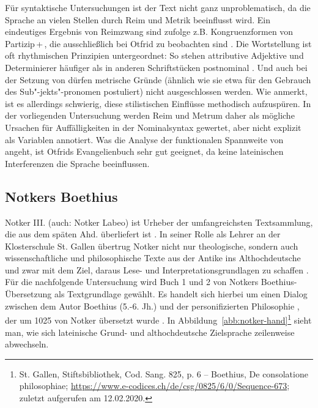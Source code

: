 Für syntaktische Untersuchungen ist der Text nicht ganz unproblematisch, da die Sprache an vielen Stellen durch Reim und Metrik beeinflusst wird. Ein eindeutiges Ergebnis von  Reimzwang sind \textcite[35-36]{Fleischer2006} zufolge z.B. Kongruenzformen von Partizip\,+\,, die ausschließlich bei Otfrid zu beobachten sind \parencites()()[s. auch][52]{Fleischer2011}[]{Gillmann2016}. 
Die Wortstellung ist oft rhythmischen Prinzipien untergeordnet: So stehen attributive Adjektive und Determinierer häufiger als in anderen Schriftstücken postnominal \parencites()()[282-283]{Oubouzar1989}[29]{Schrodt2004}. Und auch bei der Setzung von  dürfen metrische Gründe (ähnlich wie  \textcite{Eggenberger1961} sie etwa für den Gebrauch des Sub"-jekts"-pronomen postuliert) nicht ausgeschlossen werden. Wie \textcite[37]{Fleischer2006} anmerkt, ist es allerdings schwierig, diese stilistischen Einflüsse methodisch aufzuspüren. In der vorliegenden Untersuchung werden Reim und Metrum daher als mögliche Ursachen für Auffälligkeiten in der Nominalsyntax gewertet, aber nicht explizit als Variablen annotiert. Was die Analyse der funktionalen Spannweite von  angeht, ist Otfrids Evangelienbuch sehr gut geeignet, da keine lateinischen Interferenzen die Sprache beeinflussen. 

\subsection{Notkers Boethius} \label{sec:notker}

Notker III. (auch: Notker Labeo) ist Urheber der umfangreichsten Textsammlung, die aus dem späten Ahd. überliefert ist \parencites[157]{Meineke2001}. In seiner Rolle als Lehrer an der Klosterschule St. Gallen übertrug Notker nicht nur theologische, sondern auch wissenschaftliche und philosophische Texte aus der Antike ins Althochdeutsche und zwar mit dem Ziel, daraus Lese- und Interpretationsgrundlagen zu schaffen \parencite[zur Übersicht s.][136]{Sonderegger2003}. Für die nachfolgende Untersuchung wird Buch 1 und 2 von Notkers Boethius-Übersetzung  als Textgrundlage gewählt. Es handelt sich hierbei um einen Dialog zwischen dem Autor Boethius (5.-6. Jh.) und der personifizierten Philosophie \parencite[vgl.][]{Gruber2006}, der um 1025 von Notker übersetzt wurde \parencite[138]{Sonderegger2003}. 
In Abbildung~\ref{abb:notker-hand}\footnote{St. Gallen, Stiftsbibliothek, Cod. Sang. 825, p. 6 – Boethius, De consolatione philosophiae; \url{https://www.e-codices.ch/de/csg/0825/6/0/Sequence-673}; zuletzt aufgerufen am 12.02.2020.} sieht man, wie sich lateinische Grund- und althochdeutsche Zielsprache zeilenweise abwechseln.   


